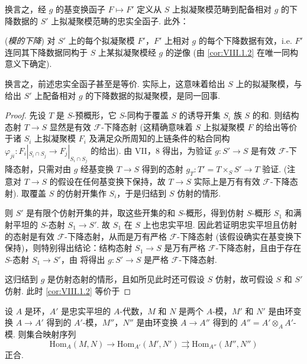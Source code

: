 换言之，经 $g$ 的基变换函子 $F \mapsto F'$ 定义从 $S$ 上拟凝聚模范畴到配备相对 $g$ 的下降数据的 $S'$ 上拟凝聚模范畴的忠实全函子. 此外：

\begin{corollary}\label{cor:VIII.1.3}
(\emph{模的下降}) 对 $S'$ 上的每个拟凝聚模 $F'$，$F'$ 上相对 $g$ 的每个下降数据有效，i.e. $F'$ 连同其下降数据同构于 $S$ 上某拟凝聚模经 $g$ 的逆像 (由 \ref{cor:VIII.1.2} 在唯一同构意义下确定).
\end{corollary}

换言之，前述忠实全函子甚至是等价. 实际上，这意味着给出 $S$ 上的拟凝聚模，与给出 $S'$ 上配备相对 $g$ 的下降数据的拟凝聚模，是同一回事.

\begin{proof}
先设 $T$ 是 $S$-预概形，它 $S$-同构于覆盖 $S$ 的诱导开集 $S_i$ 族 $S$ 的和. 则结构态射 $T \to S$ 显然是有效 $\mathcal{F}$-下降态射 (这精确意味着 $S$ 上拟凝聚模 $F$ 的给出等价于诸 $S_i$ 上拟凝聚模 $F_i$ 及满足众所周知的上链条件的粘合同构 $\varphi_{ji} \colon F_i|_{S_i \cap S_j} \to F_j|_{S_i \cap S_j}$ 的给出). 由 VII，8 得出，为验证 $g \colon S' \to S$ 是有效 $\mathcal{F}$-下降态射，只需对由 $g$ 经基变换 $T \to S$ 得到的态射 $g_T \colon T' = T \times_S S' \to T$ 验证. (注意对 $T \to S$ 的假设在任何基变换下保持，故 $T \to S$ 实际上是万有有效 $\mathcal{F}$-下降态射). 取覆盖 $S$ 的仿射开集作 $S_i$，于是归结到 $S$ 仿射的情形.

则 $S'$ 是有限个仿射开集的并，取这些开集的和 $S$-概形，得到仿射 $S$-概形 $S_1$ 和满射平坦的 $S$-态射 $S_1 \to S'$. 故 $S_1$ 在 $S$ 上也忠实平坦. 因此若证明忠实平坦且仿射的态射是有效 $\mathcal{F}$-下降态射，从而是万有严格 $\mathcal{F}$-下降态射 (该假设确实在基变换下保持)，则特别得出结论：结构态射 $S_1 \to S$ 是万有严格 $\mathcal{F}$-下降态射，且由于存在 $S$-态射 $S_1 \to S'$，由 \cite{exp08-D} 将得出 $g \colon S' \to S$ 是严格 $\mathcal{F}$-下降态射.

这归结到 $g$ 是仿射态射的情形，且如所见此时还可假设 $S$ 仿射，故可假设 $S$ 和 $S'$ 仿射. 此时 \ref{cor:VIII.1.2} 等价于
\end{proof}

\begin{lemma}\label{lem:VIII.1.4}
设 $A$ 是环，$A'$ 是忠实平坦的 $A$-代数，$M$ 和 $N$ 是两个 $A$-模，$M'$ 和 $N'$ 是由环变换 $A \to A'$ 得到的 $A'$-模，$M''$，$N''$ 是由环变换 $A \to A''$ 得到的 $A'' = A' \otimes_A A'$-模. 则集合映射序列
\[
\mathrm{Hom}_A(M, N) \longrightarrow \mathrm{Hom}_{A'}(M', N') \rightrightarrows \mathrm{Hom}_{A''}(M'', N'')
\]
正合.
\end{lemma}

